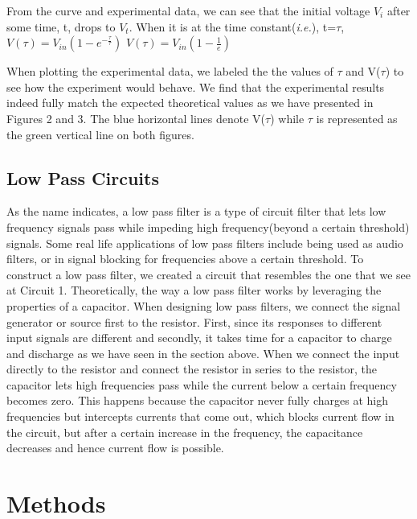 \documentclass[twocolumn]{article}\usepackage[english]{babel}
\begin{document}
From the curve and experimental data, we can see that the initial voltage
$V_i$ after some time, t, drops to $V_t$. When it is at the time
constant(\textit{i.e.}), t=$\tau$, \newline \newline
\(V(\tau) = V_{in}\left(1 - e^{-\frac{\tau}{\tau}}\right)\) \newline
\(V(\tau) = V_{in}\left(1-\frac{1}{e}\right)\) \newline 

When plotting the experimental data, we labeled the the values of $\tau$ and V($\tau$) to see how the experiment would behave. We find that the experimental results indeed fully match the expected theoretical values as we have presented in Figures 2 and 3. The blue horizontal lines denote V($\tau$) while $\tau$ is represented as the green vertical line on both figures.   
\subsection{Low Pass Circuits}
As the name indicates, a low pass filter is a type of circuit filter that lets low frequency signals pass while impeding high frequency(beyond a certain threshold) signals. Some real life applications of low pass filters include being used as audio filters, or in signal blocking for frequencies above a certain threshold. To construct a low pass filter, we created a circuit that resembles the one that we see at Circuit 1. Theoretically, the way a low pass filter works by leveraging the properties of a capacitor. When designing low pass filters, we connect the signal generator or source first to the resistor. First, since its responses to different input signals are different and secondly, it takes time for a capacitor to charge and discharge as we have seen in the section above. 
When we connect the input directly to the resistor and connect the resistor in series to the resistor, the capacitor lets high frequencies pass while the current below a certain frequency becomes zero. This happens because the capacitor never fully charges at high frequencies but intercepts currents that come out, which blocks current flow in the circuit, but after a certain increase in the frequency, the capacitance decreases and hence current flow is possible.
\section{Methods}
\end{document}
